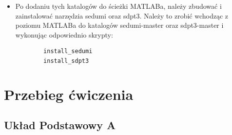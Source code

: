 \documentclass{sprawozdanie-agh}
\begin{document}
\begin{itemize}
    \item Po dodaniu tych katalogów do ścieżki MATLABa, należy zbudować i zainstalować
    narzędzia sedumi oraz sdpt3. Należy to zrobić wchodząc z poziomu MATLABa do
    katalogów sedumi-master oraz sdpt3-master i wykonując odpowiednio skrypty:
    \begin{verbatim}
        install_sedumi
        install_sdpt3
    \end{verbatim}
\end{itemize} 

\section{Przebieg ćwiczenia}  
    \subsection{Układ Podstawowy A}
\end{document}
